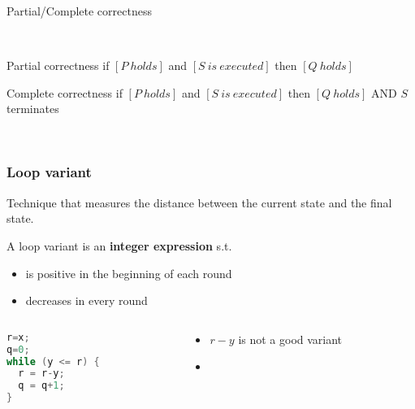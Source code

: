 \documentclass[aspectratio=169]{beamer}
\begin{document}
\begin{frame}{Partial/Complete correctness}

~~\\[10mm]

\begin{alertblock}{Partial correctness}
  if $[P~holds]$ and $[S~is~executed]$ then $[Q~holds]$
\end{alertblock}

\begin{alertblock}{Complete correctness}
  if $[P~holds]$ and $[S~is~executed]$ then $[Q~holds]$ \alert{AND $S$ terminates}
\end{alertblock}

\pause
~

\end{frame}


\begin{frame}[fragile]\frametitle{Loop variant}
  
  Technique that measures the distance between the current state and the final state.

  \begin{block}{A loop variant is an \textbf{integer expression} s.t.}
    \begin{itemize}
      \item is positive in the beginning of each round
      \item decreases in every round
    \end{itemize}
  \end{block}

\begin{columns}
\begin{column}{0.48\textwidth}
\begin{lstlisting}[language=C++]
r=x;
q=0;
while (y <= r) {
  r = r-y;
  q = q+1;
}
\end{lstlisting}
\end{column}
\begin{column}{0.48\textwidth}
  \begin{itemize}
    \item $r-y$ is not a good variant
    \item {}
  \end{itemize}
\end{column}
\end{columns}

\end{frame}
\end{document}
